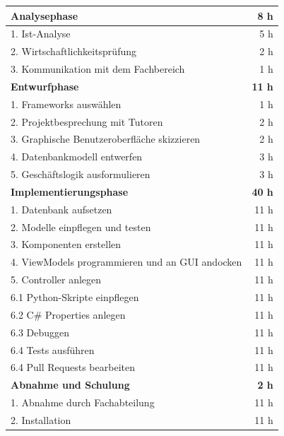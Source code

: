 \documentclass[11pt,toc=sectionentrywithoutdots, 
headheight=44pt, headings=optiontoheadandtoc, hyperfootnotes=false]{scrartcl}
\begin{document}
\begin{table}[ht]
	\begin{center}
		\begin{tabular}{ ||l|r|| }
			\hline
			
			\textbf{Analysephase} 										& \textbf{8 h}	\\
			\hline			
			1. Ist-Analyse												& 5 h			\\
			2. Wirtschaftlichkeitsprüfung								& 2 h			\\		
			3. Kommunikation mit dem Fachbereich						& 1 h			\\
			\hline

			\textbf{Entwurfphase} 										& \textbf{11 h}	\\
			\hline
			1. Frameworks auswählen										& 1 h			\\
			2. Projektbesprechung mit Tutoren							& 2 h			\\		
			3. Graphische Benutzeroberfläche skizzieren					& 2 h			\\
			4. Datenbankmodell entwerfen								& 3 h			\\
			5. Geschäftslogik ausformulieren							& 3 h			\\			
			\hline

			\textbf{Implementierungsphase} 								& \textbf{40 h}	\\
			\hline
			1. Datenbank aufsetzen										& 11 h 			\\
			2. Modelle einpflegen und testen							& 11 h 			\\
			3. Komponenten erstellen 									& 11 h 			\\
			4. ViewModels programmieren	und an GUI andocken				& 11 h 			\\
			5. Controller anlegen										& 11 h 			\\
			6.1 Python-Skripte einpflegen								& 11 h 			\\
			6.2 C\# Properties anlegen									& 11 h 			\\
			6.3 Debuggen												& 11 h 			\\
			6.4 Tests ausführen											& 11 h 			\\
			6.4 Pull Requests bearbeiten								& 11 h 			\\			
			\hline

			\textbf{Abnahme und Schulung}		 						& \textbf{2 h}	\\
			\hline
			1. Abnahme durch Fachabteilung								& 11 h 			\\
			2. Installation												& 11 h 			\\
			\hline


\end{tabular}
\end{center}
\end{table}
\end{document}
